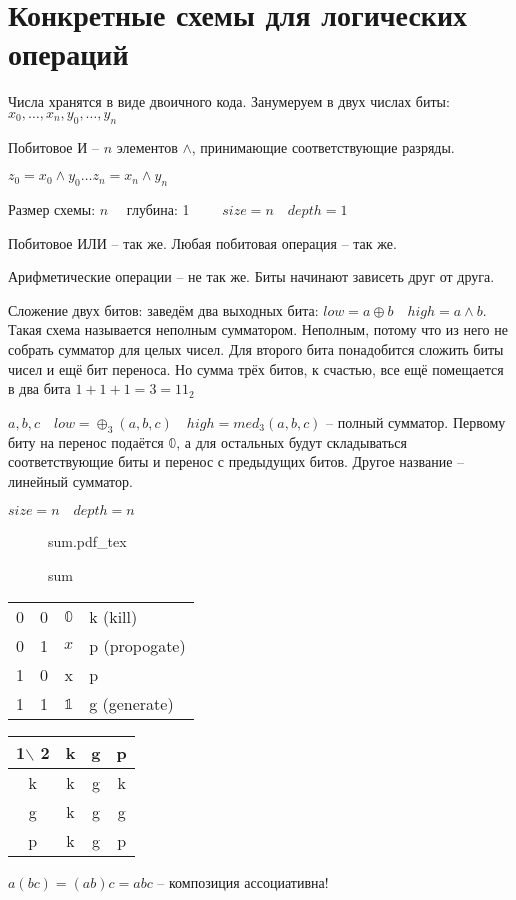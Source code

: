 \documentclass{book}
\theoremstyle{definition}
\newcommand{\incfig}[1]{%
    \def\svgwidth{\columnwidth}
    {#1.pdf_tex}
}
\begin{document}
\section{Конкретные схемы для логических операций}

Числа хранятся в виде двоичного кода. Занумеруем в двух числах биты: $x_0, \ldots, x_{n}, y_0, \ldots, y_{n} $

Побитовое И -- $n$ элементов  $\land$, принимающие соответствующие разряды.

$z_0 = x_0\land y_0 \ldots z_n = x_{n} \land y_{n} $

Размер схемы: $n\quad $ глубина: 1  $\qquad size=n\quad depth=1$

Побитовое ИЛИ -- так же. Любая побитовая операция -- так же.

Арифметические операции -- не так же. Биты начинают зависеть друг от друга.

Сложение двух битов: заведём два выходных бита:  $low = a\oplus b\quad high = a\land b$. Такая схема называется неполным сумматором. Неполным, потому что из него не собрать сумматор для целых чисел. Для второго бита понадобится сложить биты чисел и ещё бит переноса. Но сумма трёх битов, к счастью, все ещё помещается в два бита $1+1+1=3 = 11_2$

$a,b,c\quad low = \oplus_3\left( a, b, c \right)\quad high = med_3\left( a, b, c \right)  $ -- полный сумматор. Первому биту на перенос подаётся $\mathbb{0}$, а для остальных будут складываться соответствующие биты и перенос с предыдущих битов. Другое название -- линейный сумматор.

$size=n\quad depth = n$

\begin{figure}[ht]
    \centering
    \incfig{sum}
    \caption{sum}
    \label{fig:sum}
\end{figure}

\begin{tabular}{cc|cl}
    0&0& $\mathbb{0}$ &k (kill)\\
    0&1& $x$ & p (propogate)\\
    1&0& x & p\\
    1&1& $\mathbb{1}$ &g (generate)
    
\end{tabular}

\begin{tabular}{c|ccc}
    1$\backslash$ 2&k&g&p\\ \hline
    k&k&g&k\\
    g&k&g&g\\
    p&k&g&p\\
\end{tabular}
$a(bc) = (ab)c = abc$ -- композиция ассоциативна!
\end{document}
